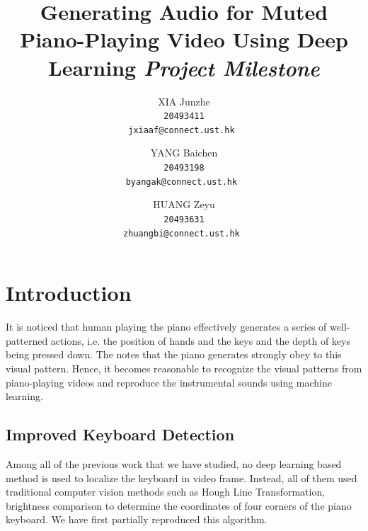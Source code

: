 \documentclass[10pt,twocolumn,letterpaper]{article}
\begin{document}
\title{Generating Audio for Muted Piano-Playing Video Using Deep Learning \newline \newline \textit{Project Milestone}}


\author{XIA Junzhe\\
\tt\small 20493411\\
{\tt\small jxiaaf@connect.ust.hk}
\and
YANG Baichen\\
\tt\small 20493198\\
{\tt\small byangak@connect.ust.hk}
\and
HUANG Zeyu\\
\tt\small 20493631\\
{\tt\small zhuangbi@connect.ust.hk}
}


\maketitle

\section{Introduction}
It is noticed that human playing the piano effectively generates a series of well-patterned actions,
i.e. the position of hands and the keys and the depth of keys being pressed down.
The notes that the piano generates strongly obey to this visual pattern.
Hence, it becomes reasonable to recognize the visual patterns from piano-playing videos and reproduce the instrumental sounds using machine learning.

\subsection{Improved Keyboard Detection}

Among all of the previous work that we have studied, no deep learning based method is used to localize the keyboard in video frame. 
Instead, all of them used traditional computer vision methods such as Hough Line Transformation, brightness comparison to determine the coordinates of four corners of the piano keyboard. 
We have first partially reproduced this algorithm.
\end{document}
